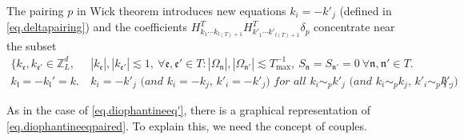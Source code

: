The pairing $p$ in Wick theorem introduces new equations $k_{i}=-k'_{j}$ (defined in \eqref{eq.deltapairing}) and the coefficients $H^T_{k_1\cdots k_{l(T)+1}} H^{T}_{k'_1\cdots k'_{l(T)+1}} \delta_{p}$ concentrate near the subset 
\begin{equation}\label{eq.diophantineeqpaired}
\begin{split}
    \{k_{\mathfrak{e}}, k_{\mathfrak{e}'}\in \mathbb{Z}^d_L,\ &|k_{\mathfrak{e}}|, |k_{\mathfrak{e}'}|\lesssim 1,\ \forall \mathfrak{e},\mathfrak{e}'\in T: |\Omega_{\mathfrak{n}}|,|\Omega_{\mathfrak{n}'}|\lesssim T^{-1}_{\text{max}},\ S_{\mathfrak{n}}=S_{\mathfrak{n}'}=0\ \forall \mathfrak{n},\mathfrak{n}'\in T.
    \\
    k_{\mathfrak{l}}=-k_{\mathfrak{l}}'=k.\  
    &\textit{$k_{i}=-k'_{j}$ (and $k_{i}=-k_{j}$, $k'_{i}=-k'_{j}$) for all $k_{i}\sim_{p}k'_{j}$ (and $k_{i}\sim_{p}k_{j}$, $k'_{i}\sim_{p}k'_{j}$)}\}.
\end{split}
\end{equation}

As in the case of \eqref{eq.diophantineeq'}, there is a graphical representation of \eqref{eq.diophantineeqpaired}. To explain this, we need the concept of couples.



